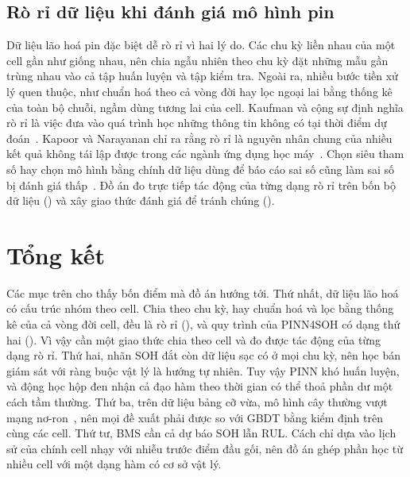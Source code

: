 \subsection{Rò rỉ dữ liệu khi đánh giá mô hình pin}

Dữ liệu lão hoá pin đặc biệt dễ rò rỉ vì hai lý do. Các chu kỳ liền nhau của một cell gần như giống nhau, nên chia ngẫu
nhiên theo chu kỳ đặt những mẫu gần trùng nhau vào cả tập huấn luyện và tập kiểm tra. Ngoài ra, nhiều bước tiền xử lý quen
thuộc, như chuẩn hoá theo cả vòng đời hay lọc ngoại lai bằng thống kê của toàn bộ chuỗi, ngầm dùng tương lai của cell.
Kaufman và cộng sự định nghĩa rò rỉ là việc đưa vào quá trình học những thông tin không có tại thời điểm dự
đoán~\cite{kaufman2012}. Kapoor và Narayanan chỉ ra rằng rò rỉ là nguyên nhân chung của nhiều kết quả không tái lập được
trong các ngành ứng dụng học máy~\cite{kapoor2023}. Chọn siêu tham số hay chọn mô hình bằng chính dữ liệu dùng để báo cáo
sai số cũng làm sai số bị đánh giá thấp~\cite{varma2006}. Đồ án đo trực tiếp tác động của từng dạng rò rỉ trên bốn bộ dữ
liệu () và xây giao thức đánh giá để tránh chúng ().

\section{Tổng kết}\label{sec:tongket_lt}

Các mục trên cho thấy bốn điểm mà đồ án hướng tới. Thứ nhất, dữ liệu lão hoá có cấu trúc nhóm theo cell. Chia theo chu
kỳ, hay chuẩn hoá và lọc bằng thống kê của cả vòng đời cell, đều là rò rỉ (), và quy trình của
PINN4SOH có dạng thứ hai (). Vì vậy cần một giao thức chia theo cell và đo được tác động của từng
dạng rò rỉ. Thứ hai, nhãn SOH đắt còn dữ liệu sạc có ở mọi chu kỳ, nên học bán giám sát với ràng buộc vật lý là hướng tự
nhiên. Tuy vậy PINN khó huấn luyện, và động học hộp đen nhận cả đạo hàm theo thời gian có thể thoả phần dư một cách tầm
thường. Thứ ba, trên dữ liệu bảng cỡ vừa, mô hình cây thường vượt mạng nơ-ron~\cite{grinsztajn2022}, nên mọi đề xuất phải
được so với GBDT bằng kiểm định trên cùng các cell. Thứ tư, BMS cần cả dự báo SOH lẫn RUL. Cách chỉ dựa vào lịch sử của
chính cell nhạy với nhiễu trước điểm đầu gối, nên đồ án ghép phần học từ nhiều cell với một dạng hàm có cơ sở vật lý.
